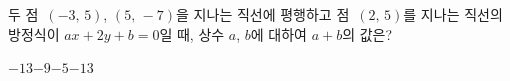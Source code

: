 두 점~$(-3,\,5)$, $(5,\,-7)$을 지나는 직선에 평행하고 점~$(2,\,5)$를 지나는 직선의 방정식이 $ax+2y+b=0$일 때, 상수 $a$, $b$에 대하여 $a+b$의 값은?
\begin{choices32}{$-13$}{$-9$}{$-5$}{$-1$}{$3$}\end{choices32}
